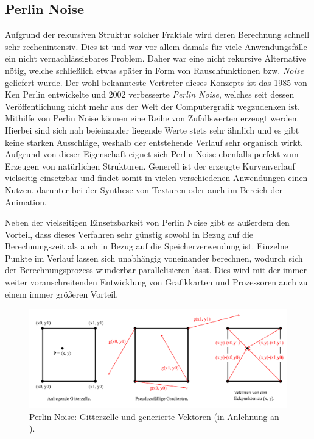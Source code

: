 \subsection{Perlin Noise}
Aufgrund der rekursiven Struktur solcher Fraktale wird deren Berechnung schnell sehr rechenintensiv. Dies ist und war vor allem
damals für viele Anwendungsfälle ein nicht vernachlässigbares Problem. \cite{24_blatz_korn} Daher war eine nicht rekursive
Alternative nötig, welche schließlich etwas später in Form von Rauschfunktionen bzw. \textit{Noise} geliefert wurde. Der wohl
bekannteste Vertreter dieses Konzepts ist das 1985 von Ken Perlin entwickelte \cite{16_perlin} und 2002 verbesserte \cite{18_perlin}
\textit{Perlin Noise}, welches seit dessen Veröffentlichung nicht mehr aus der Welt der Computergrafik wegzudenken ist. Mithilfe von
Perlin Noise können eine Reihe von Zufallswerten erzeugt werden. Hierbei sind sich nah beieinander liegende Werte stets sehr ähnlich und
es gibt keine starken Ausschläge, weshalb der entstehende Verlauf sehr organisch wirkt. Aufgrund von dieser Eigenschaft eignet sich
Perlin Noise ebenfalls perfekt zum Erzeugen von natürlichen Strukturen. Generell ist der erzeugte Kurvenverlauf vielseitig einsetzbar
und findet somit in vielen verschiedenen Anwendungen einen Nutzen, darunter bei der Synthese von Texturen oder auch im Bereich der
Animation. \cite{17_lagae_et_al}

Neben der vielseitigen Einsetzbarkeit von Perlin Noise gibt es außerdem den Vorteil, dass dieses Verfahren sehr günstig sowohl in Bezug auf
die Berechnungszeit als auch in Bezug auf die Speicherverwendung ist. Einzelne Punkte im Verlauf lassen sich unabhängig voneinander berechnen,
wodurch sich der Berechnungsprozess wunderbar parallelisieren lässt. Dies wird mit der immer weiter voranschreitenden Entwicklung von
Grafikkarten und Prozessoren auch zu einem immer größeren Vorteil. \cite{17_lagae_et_al}

\begin{figure}[t]
    \centering
    \includegraphics[width=\imgWidth]{images/perlin_noise.pdf}
    \caption{Perlin Noise: Gitterzelle und generierte Vektoren (in Anlehnung an \cite{43_zucker}).}
    \label{fig:perlin_noise}
\end{figure}

